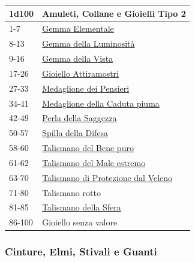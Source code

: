 \begin{multicols}{2}
{{\small\begin{tabularx}{0.45\textwidth}{lX}
		\toprule
\textbf{1d100} & \textbf{Amuleti, Collane e Gioielli Tipo 2}\\
\toprule
1-7 & \hyperlink{GemmaElementale}{Gemma Elementale}\\
8-13& \hyperlink{GemmadellaLuminosità}{Gemma della Luminosità}\\
9-16& \hyperlink{GemmadellaVista}{Gemma della Vista}\\
17-26& \hyperlink{GioielloAttiramostri}{Gioiello Attiramostri}\\
27-33& \hyperlink{MedaglionedeiPensieri}{Medaglione dei Pensieri}\\
34-41& \hyperlink{MedaglionedellaCadutapiuma}{Medaglione della Caduta piuma}\\
42-49& \hyperlink{PerladellaSaggezza}{Perla della Saggezza}\\
50-57& \hyperlink{SpilladellaDifesa}{Spilla della Difesa}\\
58-60& \hyperlink{TalismanodelBenepuro}{Talismano del Bene puro}\\
61-62& \hyperlink{TalismanodelMaleestremo}{Talismano del Male estremo}\\
63-70& \hyperlink{Talismano di Protezione dal Veleno}{Talismano di Protezione dal Veleno}\\
71-80 & Talismano rotto\\
81-85& \hyperlink{TalismanodellaSfera}{Talismano della Sfera}\\
86-100& Gioiello senza valore
\end{tabularx}}

\subsubsection{Cinture, Elmi, Stivali e Guanti}\hypertarget{cintureelmi}{}\label{cintureelmi}

}
\end{multicols}
